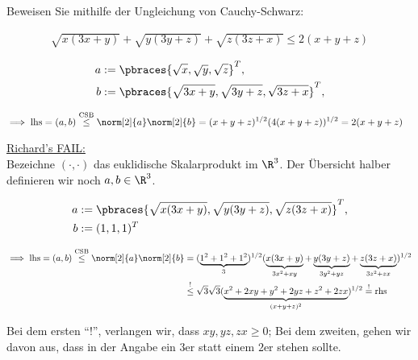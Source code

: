 
\begin{exercise}

Beweisen Sie mithilfe der Ungleichung von Cauchy-Schwarz:

\begin{align*}
    \sqrt{x (3x + y)} + \sqrt{y (3y + z)} + \sqrt{z (3z + x)}
    \leq
    2 (x + y + z)
\end{align*}

\end{exercise}


\begin{solution}

\begin{align*}
    a & := \pbraces
    {
        \sqrt{x},
        \sqrt{y},
        \sqrt{z}
    }^T, \\
    b & := \pbraces
    {
        \sqrt{3x + y},
        \sqrt{3y + z},
        \sqrt{3z + x}
    }^T, \\
\end{align*}

\begin{align*}
    \implies
    \text{lhs}
    =
    (a, b)
    \stackrel{\text{CSB}}{\leq}
    \norm[2]{a} \norm[2]{b}
    & =
    (x + y + z)^{1/2}
    (4(x+y+z)
    )^{1/2} = 2(x+y+z)
\end{align*}

\underline{Richard's FAIL:} \\

Bezeichne $(\cdot, \cdot)$ das euklidische Skalarprodukt im $\R^3$.
Der Übersicht halber definieren wir noch $a, b \in \R^3$.

\begin{align*}
    a & := \pbraces
    {
        \sqrt{x (3x + y)},
        \sqrt{y (3y + z)},
        \sqrt{z (3z + x)}
    }^T, \\
    b & := (1, 1, 1)^T
\end{align*}

\begin{align*}
    \implies
    \text{lhs}
    =
    (a, b)
    \stackrel{\text{CSB}}{\leq}
    \norm[2]{a} \norm[2]{b}
    & =
    (
        \underbrace
        {1^2 + 1^2 + 1^2}_{3}
    )^{1/2}
    (
        \underbrace{x (3x + y)}_{3x^2 + xy}
        +
        \underbrace{y (3y + z)}_{3y^2 + yz}
        +
        \underbrace{z (3z + x)}_{3z^2 + zx}
    )^{1/2} \\
    & \stackrel{!}{\leq}
    \sqrt{3} \sqrt{3}
    (
        \underbrace
        {x^2 + 2xy + y^2 + 2yz + z^2 + 2zx}_{(x + y + z)^2}
    )^{1/2}
    \stackrel{!}{=}
    \text{rhs}
\end{align*}

Bei dem ersten \enquote{!}, verlangen wir, dass $xy, yz, zx \geq 0$;
Bei dem zweiten, gehen wir davon aus, dass in der Angabe ein $3$er statt einem $2$er stehen sollte.

\end{solution}

